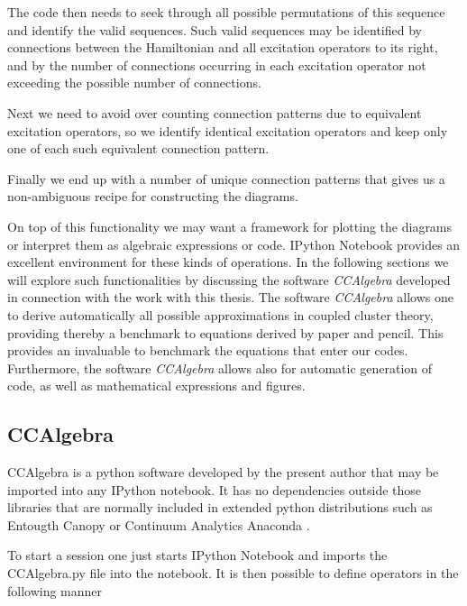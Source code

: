 The code then needs to seek through all possible permutations of this
sequence and identify the valid sequences. Such valid sequences may be
identified by connections between the Hamiltonian and all excitation
operators to its right, and by the number of connections occurring in
each excitation operator not exceeding the possible number of
connections.

Next we need to avoid over counting connection patterns due to
equivalent excitation operators, so we identify identical excitation
operators and keep only one of each such equivalent connection
pattern.

Finally we end up with a number of unique connection patterns that
gives us a non-ambiguous recipe for constructing the diagrams.

On top of this functionality we may want a framework for plotting the
diagrams or interpret them as algebraic expressions or code. IPython
Notebook \cite{ipython} provides an excellent environment for these
kinds of operations. In the following sections we will explore
such functionalities by discussing the software \emph{CCAlgebra} developed in connection with the work
with this thesis. The software \emph{CCAlgebra} allows one to derive automatically all possible approximations
in coupled cluster theory, providing thereby a benchmark to equations derived by paper and pencil. This provides an invaluable to benchmark the equations that enter our codes. Furthermore, the software \emph{CCAlgebra} allows also for automatic generation of code, as well as mathematical expressions and figures.

\subsection{CCAlgebra}

CCAlgebra is a python software developed by the present author  that may be imported into any IPython
notebook. It has no dependencies outside those libraries that are
normally included in extended python distributions such as Entougth
Canopy \cite{Entought} or Continuum Analytics Anaconda
\cite{Anaconda}.

To start a session one just starts IPython Notebook and imports the
CCAlgebra.py file into the notebook.
It is then possible to define operators in the following manner

\begin{minipage}{\linewidth}
\end{minipage}

